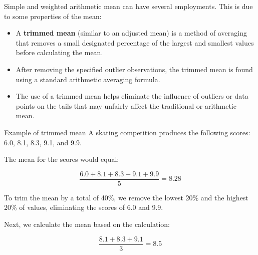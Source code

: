 
\begin{frame}
  \vspace{.25cm}
  Simple and weighted arithmetic mean can have several employments. This is due to some properties of the mean:\\
  \vspace{.25cm}
  \begin{itemize}
    \item A \textbf{trimmed mean} (similar to an adjusted mean) is a method of averaging that removes a small designated percentage of the largest and smallest values before calculating the mean.
    \item After removing the specified outlier observations, the trimmed mean is found using a standard arithmetic averaging formula.
    \item The use of a trimmed mean helps eliminate the influence of outliers or data points on the tails that may unfairly affect the traditional or arithmetic mean.
  \end{itemize}
  \vspace{.25cm}
\end{frame}


\begin{frame}
  Example of trimmed mean
  \vspace{.25cm}
  A skating competition produces the following scores: 6.0, 8.1, 8.3, 9.1, and 9.9.

  The mean for the scores would equal:

  $$\frac{6.0 + 8.1 + 8.3 + 9.1 + 9.9}{5} = 8.28$$

  To trim the mean by a total of 40\%, we remove the lowest 20\% and the highest 20\% of values, eliminating the scores of 6.0 and 9.9.

  Next, we calculate the mean based on the calculation:

  $$\frac{8.1 + 8.3 + 9.1}{3} = 8.5$$


\end{frame}







